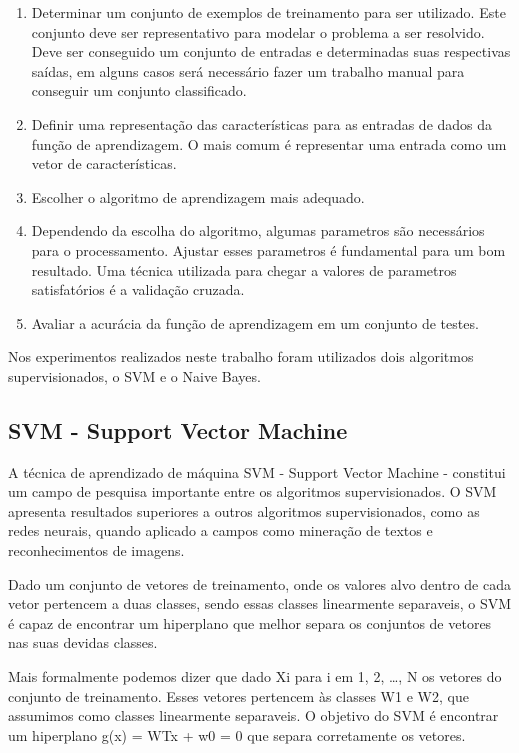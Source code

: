 \begin{enumerate}
	\item Determinar um conjunto de exemplos de treinamento para ser utilizado. Este conjunto deve ser representativo para modelar o problema a ser resolvido. Deve ser conseguido um conjunto de entradas e determinadas suas respectivas saídas, em alguns casos será necessário fazer um trabalho manual para conseguir um conjunto classificado.
	\item Definir uma representação das características para as entradas de dados da função de aprendizagem. O mais comum é representar uma entrada como um vetor de características.
	\item Escolher o algoritmo de  aprendizagem mais adequado.
	\item Dependendo da escolha do algoritmo, algumas parametros são necessários para o processamento. Ajustar esses parametros é fundamental para um bom resultado. Uma técnica utilizada para chegar a valores de parametros satisfatórios é a validação cruzada.
	\item Avaliar a acurácia da função de aprendizagem em um conjunto de testes.
\end{enumerate}


Nos experimentos realizados neste trabalho foram utilizados dois algoritmos supervisionados, o SVM e o Naive Bayes.

\subsection{SVM - Support Vector Machine}

A técnica de aprendizado de máquina SVM - Support Vector Machine - constitui um campo de pesquisa importante entre os algoritmos supervisionados. O SVM apresenta resultados superiores a outros algoritmos supervisionados, como as redes neurais, quando aplicado a campos como mineração de textos e reconhecimentos de imagens.

Dado um conjunto de vetores de treinamento, onde os valores alvo dentro de cada vetor pertencem a duas classes, sendo essas classes linearmente separaveis, o SVM é capaz de encontrar um hiperplano que melhor separa os conjuntos de vetores nas suas devidas classes.

Mais formalmente podemos dizer que dado Xi para i em {1, 2, …, N} os vetores do conjunto de treinamento. Esses vetores pertencem às classes W1 e W2, que assumimos como classes linearmente separaveis. O objetivo do SVM é encontrar um hiperplano g(x) = WTx + w0 = 0 que separa corretamente os vetores.

